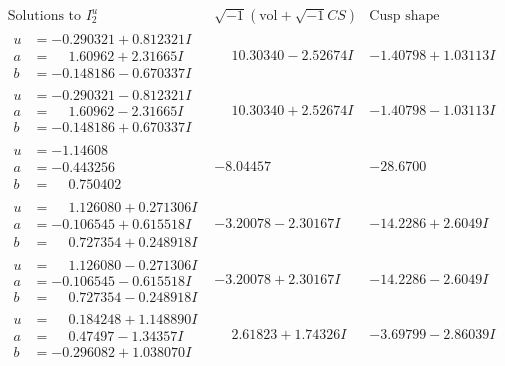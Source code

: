 \documentclass[1p]{elsarticle_modified}
\theoremstyle{definition}
\newcommand{\I}{\sqrt{-1}}
\begin{document}
$$\begin{array}{c|c|c}  
\text{Solutions to }I^u_{2}& \I (\text{vol} + \sqrt{-1}CS) & \text{Cusp shape}\\
 \hline 
\begin{aligned}
u &= -0.290321 + 0.812321 I \\
a &= \phantom{-}1.60962 + 2.31665 I \\
b &= -0.148186 - 0.670337 I\end{aligned}
 & \phantom{-}10.30340 - 2.52674 I & -1.40798 + 1.03113 I \\ \hline\begin{aligned}
u &= -0.290321 - 0.812321 I \\
a &= \phantom{-}1.60962 - 2.31665 I \\
b &= -0.148186 + 0.670337 I\end{aligned}
 & \phantom{-}10.30340 + 2.52674 I & -1.40798 - 1.03113 I \\ \hline\begin{aligned}
u &= -1.14608\phantom{ +0.000000I} \\
a &= -0.443256\phantom{ +0.000000I} \\
b &= \phantom{-}0.750402\phantom{ +0.000000I}\end{aligned}
 & -8.04457\phantom{ +0.000000I} & -28.6700\phantom{ +0.000000I} \\ \hline\begin{aligned}
u &= \phantom{-}1.126080 + 0.271306 I \\
a &= -0.106545 + 0.615518 I \\
b &= \phantom{-}0.727354 + 0.248918 I\end{aligned}
 & -3.20078 - 2.30167 I & -14.2286 + 2.6049 I \\ \hline\begin{aligned}
u &= \phantom{-}1.126080 - 0.271306 I \\
a &= -0.106545 - 0.615518 I \\
b &= \phantom{-}0.727354 - 0.248918 I\end{aligned}
 & -3.20078 + 2.30167 I & -14.2286 - 2.6049 I \\ \hline\begin{aligned}
u &= \phantom{-}0.184248 + 1.148890 I \\
a &= \phantom{-}0.47497 - 1.34357 I \\
b &= -0.296082 + 1.038070 I\end{aligned}
 & \phantom{-}2.61823 + 1.74326 I & -3.69799 - 2.86039 I \\ \hline\begin{aligned}

\end{aligned}
\end{array}$$
\end{document}
